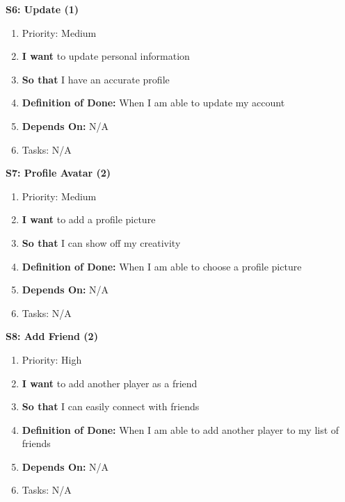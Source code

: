 \textbf{S6: Update (1)}
\begin{enumerate}
    \item Priority: Medium
    \item \textbf{I want} to update personal information
    \item \textbf{So that} I have an accurate profile
    \item \textbf{Definition of Done:} When I am able to update my account
    \item \textbf{Depends On:} N/A
    \item Tasks: N/A
\end{enumerate}


\textbf{S7: Profile Avatar (2)}
\begin{enumerate}
    \item Priority: Medium
    \item \textbf{I want} to add a profile picture
    \item \textbf{So that} I can show off my creativity
    \item \textbf{Definition of Done:} When I am able to choose a profile picture
    \item \textbf{Depends On:} N/A
    \item Tasks: N/A
\end{enumerate}


\textbf{S8: Add Friend (2)}
\begin{enumerate}
    \item Priority: High
    \item \textbf{I want} to add another player as a friend
    \item \textbf{So that} I can easily connect with friends
    \item \textbf{Definition of Done:} When I am able to add another player to my list of friends
    \item \textbf{Depends On:} N/A
    \item Tasks: N/A
\end{enumerate}


